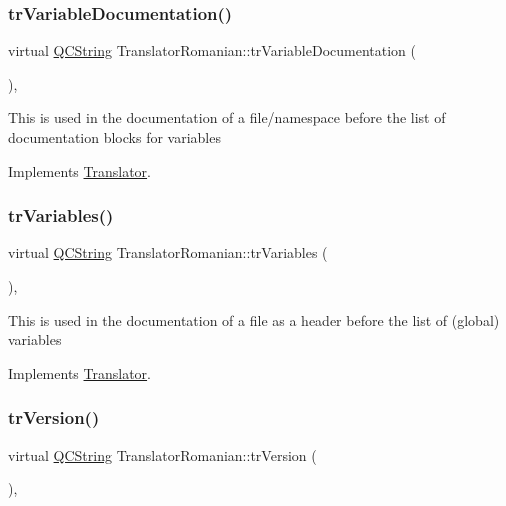 \subsubsection{\texorpdfstring{trVariableDocumentation()}{trVariableDocumentation()}}
{\footnotesize\ttfamily virtual \mbox{\hyperlink{class_q_c_string}{Q\+C\+String}} Translator\+Romanian\+::tr\+Variable\+Documentation (\begin{DoxyParamCaption}{ }\end{DoxyParamCaption})\hspace{0.3cm}{\ttfamily [inline]}, {\ttfamily [virtual]}}

This is used in the documentation of a file/namespace before the list of documentation blocks for variables 

Implements \mbox{\hyperlink{class_translator}{Translator}}.

\mbox{\label{class_translator_romanian_ae819af4d1bccb74a62fd6b50b3d9f776}} 
\subsubsection{\texorpdfstring{trVariables()}{trVariables()}}
{\footnotesize\ttfamily virtual \mbox{\hyperlink{class_q_c_string}{Q\+C\+String}} Translator\+Romanian\+::tr\+Variables (\begin{DoxyParamCaption}{ }\end{DoxyParamCaption})\hspace{0.3cm}{\ttfamily [inline]}, {\ttfamily [virtual]}}

This is used in the documentation of a file as a header before the list of (global) variables 

Implements \mbox{\hyperlink{class_translator}{Translator}}.

\mbox{\label{class_translator_romanian_ad5b94a6e753afa9300d1db3dfa782e53}} 
\subsubsection{\texorpdfstring{trVersion()}{trVersion()}}
{\footnotesize\ttfamily virtual \mbox{\hyperlink{class_q_c_string}{Q\+C\+String}} Translator\+Romanian\+::tr\+Version (\begin{DoxyParamCaption}{ }\end{DoxyParamCaption})\hspace{0.3cm}{\ttfamily [inline]}, {\ttfamily [virtual]}}

